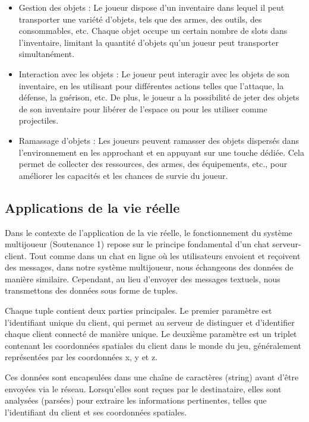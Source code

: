 \documentclass[
	article,			%
	11pt,				%
	oneside,			%
	a4paper,			%
	chapter=TITLE,
	french,			%
	sumario=tradicional
	]{base_nt}
\begin{document}
\begin{itemize}
    \item Gestion des objets : Le joueur dispose d'un inventaire dans lequel il peut transporter une variété d'objets, tels que des armes, des outils, des consommables, etc. Chaque objet occupe un certain nombre de slots dans l'inventaire, limitant la quantité d'objets qu'un joueur peut transporter simultanément.
    \item Interaction avec les objets : Le joueur peut interagir avec les objets de son inventaire, en les utilisant pour différentes actions telles que l'attaque, la défense, la guérison, etc. De plus, le joueur a la possibilité de jeter des objets de son inventaire pour libérer de l'espace ou pour les utiliser comme projectiles.
    \item Ramassage d'objets : Les joueurs peuvent ramasser des objets dispersés dans l'environnement en les approchant et en appuyant sur une touche dédiée. Cela permet de collecter des ressources, des armes, des équipements, etc., pour améliorer les capacités et les chances de survie du joueur.
\end{itemize}

\newpage

\subsection{Applications de la vie réelle}

Dans le contexte de l'application de la vie réelle, le fonctionnement du système multijoueur (Soutenance 1) repose sur le principe fondamental d'un chat serveur-client. Tout comme dans un chat en ligne où les utilisateurs envoient et reçoivent des messages, dans notre système multijoueur, nous échangeons des données de manière similaire. Cependant, au lieu d'envoyer des messages textuels, nous transmettons des données sous forme de tuples.

Chaque tuple contient deux parties principales. Le premier paramètre est l'identifiant unique du client, qui permet au serveur de distinguer et d'identifier chaque client connecté de manière unique. Le deuxième paramètre est un triplet contenant les coordonnées spatiales du client dans le monde du jeu, généralement représentées par les coordonnées x, y et z.

Ces données sont encapsulées dans une chaîne de caractères (string) avant d'être envoyées via le réseau. Lorsqu'elles sont reçues par le destinataire, elles sont analysées (parsées) pour extraire les informations pertinentes, telles que l'identifiant du client et ses coordonnées spatiales.
\end{document}

